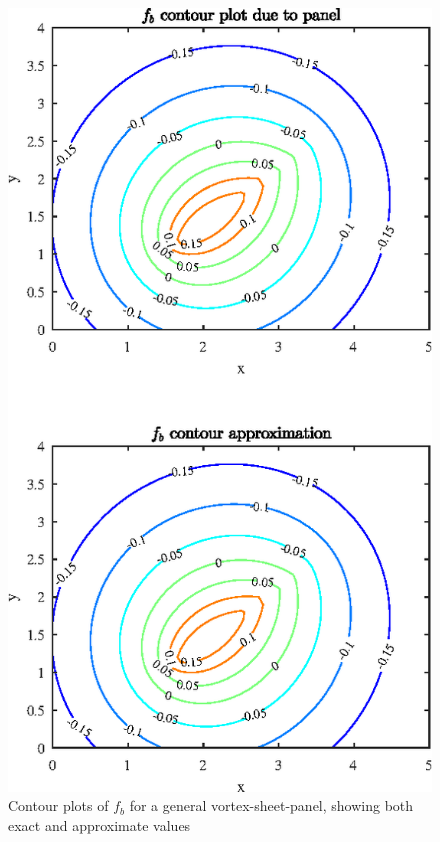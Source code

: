 \begin{figure}[H]
\centering
\includegraphics[scale=1.55]{graphs/e3g2.eps}
\caption{Contour plots of $f_b$ for a general vortex-sheet-panel, showing both exact and approximate values}
\label{e3g2}
\end{figure}

